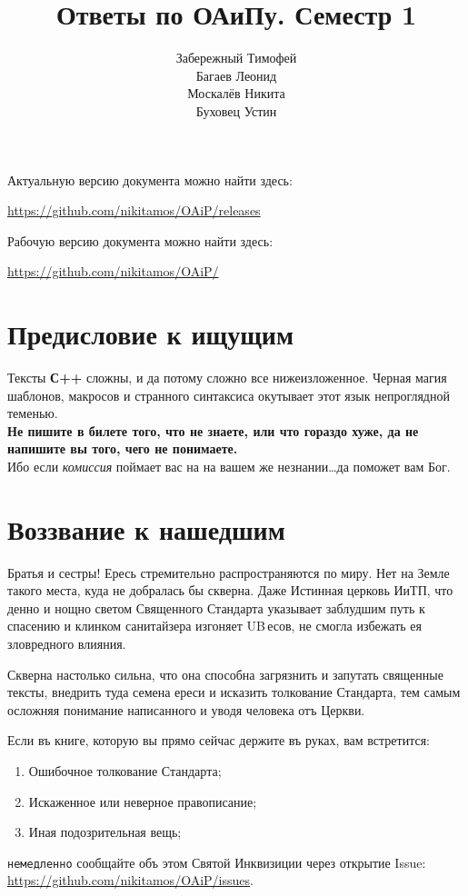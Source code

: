 \documentclass[12pt, a4paper]{extarticle}
\author{
  Забережный Тимофей \\
  Багаев     Леонид  \\
  Москалёв   Никита  \\
  Буховец    Устин   \\
}
\title{Ответы по ОАиПу. Семестр 1}
\begin{document}
\clearpage\maketitle
\thispagestyle{empty}

\vspace{15cm}

\begin{center}
  Актуальную версию документа можно найти здесь:

  \url{https://github.com/nikitamos/OAiP/releases}
  
  \vspace{5mm}
  Рабочую версию документа можно найти здесь:

  \url{https://github.com/nikitamos/OAiP/}
\end{center}

\newpage
\section*{Предисловие к ищущим}
\large{Тексты \textbf{С++} сложны, и да потому сложно все нижеизложенное.
Черная магия шаблонов, макросов и странного синтаксиса окутывает этот язык непроглядной теменью.}\\

\Large{\textbf{Не пишите в билете того, что не знаете, или что гораздо хуже, да не напишите вы того, чего не понимаете.}}\\

\large{Ибо если \textit{комиссия} поймает вас на на вашем же незнании\dots да поможет вам Бог.}

\section*{Воззвание к нашедшим}
Братья и сестры! Ересь стремительно распространяются по миру. Нет
на Земле такого места, куда не добралась бы скверна. Даже Истинная
церковь ИиТП, что денно и нощно светом Священного Стандарта указывает заблудшим
путь к спасению и клинком санитайзера изгоняет UB\,есов, не смогла избежать
ея зловредного влияния.

Скверна настолько сильна, что она способна загрязнить и запутать священные тексты,
внедрить туда семена ереси и исказить толкование Стандарта, тем самым осложняя
понимание написанного и уводя человека отъ Церкви. 

Если въ книге, которую вы прямо сейчас держите въ руках, вам встретится:
\begin{enumerate}
  \item Ошибочное толкование Стандарта;
  \item Искаженное или неверное правописание;
  \item Иная подозрительная вещь;
\end{enumerate}
\texttt{немедленно} сообщайте объ этом Святой Инквизиции через открытие Issue:
\url{https://github.com/nikitamos/OAiP/issues}.
\end{document}
